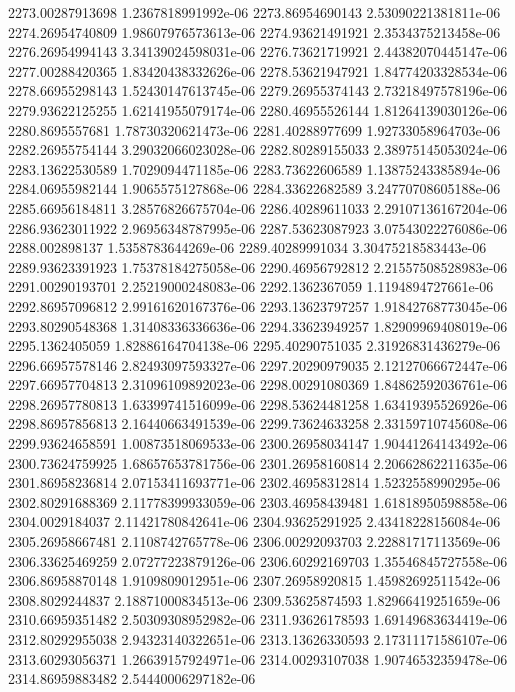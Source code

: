{2273.00287913698 1.2367818991992e-06
2273.86954690143 2.53090221381811e-06
2274.26954740809 1.98607976573613e-06
2274.93621491921 2.3534375213458e-06
2276.26954994143 3.34139024598031e-06
2276.73621719921 2.44382070445147e-06
2277.00288420365 1.83420438332626e-06
2278.53621947921 1.84774203328534e-06
2278.66955298143 1.52430147613745e-06
2279.26955374143 2.73218497578196e-06
2279.93622125255 1.62141955079174e-06
2280.46955526144 1.81264139030126e-06
2280.8695557681 1.78730320621473e-06
2281.40288977699 1.92733058964703e-06
2282.26955754144 3.29032066023028e-06
2282.80289155033 2.38975145053024e-06
2283.13622530589 1.7029094471185e-06
2283.73622606589 1.13875243385894e-06
2284.06955982144 1.9065575127868e-06
2284.33622682589 3.24770708605188e-06
2285.66956184811 3.28576826675704e-06
2286.40289611033 2.29107136167204e-06
2286.93623011922 2.96956348787995e-06
2287.53623087923 3.07543022276086e-06
2288.002898137 1.5358783644269e-06
2289.40289991034 3.30475218583443e-06
2289.93623391923 1.75378184275058e-06
2290.46956792812 2.21557508528983e-06
2291.00290193701 2.25219000248083e-06
2292.1362367059 1.1194894727661e-06
2292.86957096812 2.99161620167376e-06
2293.13623797257 1.91842768773045e-06
2293.80290548368 1.31408336336636e-06
2294.33623949257 1.82909969408019e-06
2295.1362405059 1.82886164704138e-06
2295.40290751035 2.31926831436279e-06
2296.66957578146 2.82493097593327e-06
2297.20290979035 2.12127066672447e-06
2297.66957704813 2.31096109892023e-06
2298.00291080369 1.84862592036761e-06
2298.26957780813 1.63399741516099e-06
2298.53624481258 1.63419395526926e-06
2298.86957856813 2.16440663491539e-06
2299.73624633258 2.33159710745608e-06
2299.93624658591 1.00873518069533e-06
2300.26958034147 1.90441264143492e-06
2300.73624759925 1.68657653781756e-06
2301.26958160814 2.20662862211635e-06
2301.86958236814 2.07153411693771e-06
2302.46958312814 1.5232558990295e-06
2302.80291688369 2.11778399933059e-06
2303.46958439481 1.61818950598858e-06
2304.0029184037 2.11421780842641e-06
2304.93625291925 2.43418228156084e-06
2305.26958667481 2.1108742765778e-06
2306.00292093703 2.22881717113569e-06
2306.33625469259 2.07277223879126e-06
2306.60292169703 1.35546845727558e-06
2306.86958870148 1.9109809012951e-06
2307.26958920815 1.45982692511542e-06
2308.8029244837 2.18871000834513e-06
2309.53625874593 1.82966419251659e-06
2310.66959351482 2.50309308952982e-06
2311.93626178593 1.69149683634419e-06
2312.80292955038 2.94323140322651e-06
2313.13626330593 2.17311171586107e-06
2313.60293056371 1.26639157924971e-06
2314.00293107038 1.90746532359478e-06
2314.86959883482 2.54440006297182e-06
}
